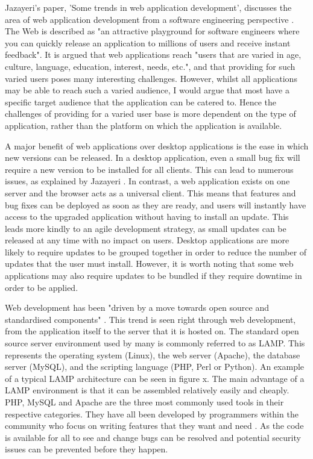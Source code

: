 \documentclass[authoryearcitations]{UoYCSproject}
\begin{document}
Jazayeri's paper, 'Some trends in web application development', discusses the area of web application development from a software engineering perspective \citep{Jazayeri2007}. The Web is described as "an attractive playground for software engineers where you can quickly release an application to millions of users and receive instant feedback". It is argued that web applications reach "users that are varied in age, culture, language, education, interest, needs, etc.", and that providing for such varied users poses many interesting challenges. However, whilst all applications may be able to reach such a varied audience, I would argue that most have a specific target audience that the application can be catered to. Hence the challenges of providing for a varied user base is more dependent on the type of application, rather than the platform on which the application is available. 

A major benefit of web applications over desktop applications is the ease in which new versions can be released. In a desktop application, even a small bug fix will require a new version to be installed for all clients. This can lead to numerous issues, as explained by Jazayeri \citep{Jazayeri2007}. In contrast, a web application exists on one server and the browser acts as a universal client. This means that features and bug fixes can be deployed as soon as they are ready, and users will instantly have access to the upgraded application without having to install an update. This leads more kindly to an agile development strategy, as small updates can be released at any time with no impact on users. Desktop applications are more likely to require updates to be grouped together in order to reduce the number of updates that the user must install. However, it is worth noting that some web applications may also require updates to be bundled if they require downtime in order to be applied.  

Web development has been "driven by a move towards open source and standardised components" \citep{Jazayeri2007}. This trend is seen right through web development, from the application itself to the server that it is hosted on. The standard open source server environment used by many is commonly referred to as LAMP. This represents the operating system (Linux), the web server (Apache), the database server (MySQL), and the scripting language (PHP, Perl or Python). An example of a typical LAMP architecture can be seen in figure x. The main advantage of a  LAMP environment is that it can be assembled relatively easily and cheaply. PHP, MySQL and Apache are the three most commonly used tools in their respective categories. They have all been developed by programmers within the community who focus on writing features that they want and need \citep{Nixon2009}. As the code is available for all to see and change bugs can be resolved and potential security issues can be prevented before they happen.
\end{document}
